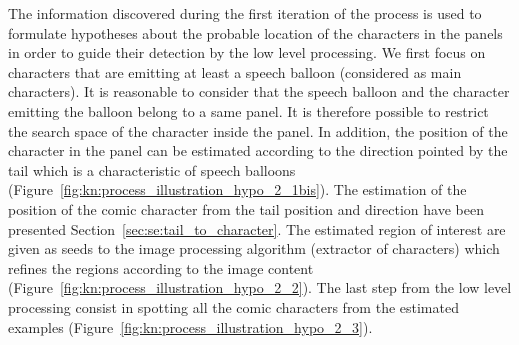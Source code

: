The information discovered during the first iteration of the process is used to formulate hypotheses about the probable location of the characters in the panels in order to guide their detection by the low level processing.
We first focus on characters that are emitting at least a speech balloon (considered as main characters).
It is reasonable to consider that the speech balloon and the character emitting the balloon belong to a same panel.
It is therefore possible to restrict the search space of the character inside the panel.
In addition, the position of the character in the panel can be estimated according to the direction pointed by the tail which is a characteristic of speech balloons (Figure~\ref{fig:kn:process_illustration_hypo_2_1bis}).
The estimation of the position of the comic character from the tail position and direction have been presented Section~\ref{sec:se:tail_to_character}.
The estimated region of interest are given as seeds to the image processing algorithm (extractor of characters) which refines the regions according to the image content (Figure~\ref{fig:kn:process_illustration_hypo_2_2}).
The last step from the low level processing consist in spotting all the comic characters from the estimated examples (Figure~\ref{fig:kn:process_illustration_hypo_2_3}).



